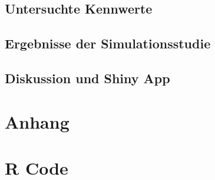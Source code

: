 \documentclass[12pt]{article}\usepackage[]{graphicx}\usepackage[]{color}
\begin{document}
\subsection{Untersuchte Kennwerte}










\subsection{Ergebnisse der Simulationsstudie}
\subsection{Diskussion und Shiny App}


\newpage
\singlespacing




\section{Anhang}
\appendix
\section{R Code}
\end{document}
